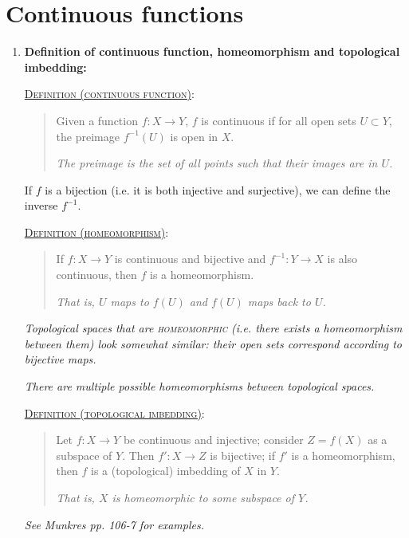 \documentclass[letterpaper, 12pt]{book}
\newcommand{\defn}[2]{\textsc{\underline{Definition (#1)}:}\begin{quote} #2\end{quote}}
\begin{document}
\chapter{Continuous functions}
    \begin{enumerate}[resume]
    \item \textbf{Definition of continuous function, homeomorphism and topological imbedding:}

        \defn{continuous function}{Given a function $f:X\to Y$, $f$ is continuous if for all open sets $U\subset Y$, the preimage $f^{-1}(U)$ is open in $X$.

        \textit{The preimage is the set of all points such that their images are in $U$.}}

        If $f$ is a bijection (i.e. it is both injective and surjective), we can define the inverse $f^{-1}$.

        \defn{homeomorphism}{If $f:X\to Y$ is continuous and bijective and $f^{-1}:Y\to X$ is also continuous, then $f$ is a homeomorphism.

        \textit{That is, $U$ maps to $f(U)$ and $f(U)$ maps back to $U$.}}

        \textit{Topological spaces that are \textsc{homeomorphic} (i.e. there exists a homeomorphism between them) look somewhat similar: their open sets correspond according to bijective maps.}

        \textit{There are multiple possible homeomorphisms between topological spaces.}

        \defn{topological imbedding}{Let $f:X\to Y$ be continuous and injective; consider $Z=f(X)$ as a subspace of $Y$. Then $f':X\to Z$ is bijective; if $f'$ is a homeomorphism, then $f$ is a (topological) imbedding of $X$ in $Y$.

        \textit{That is, $X$ is homeomorphic to some subspace of $Y$.}}

        \textit{See Munkres pp. 106-7 for examples.}
    \end{enumerate}
\end{document}
